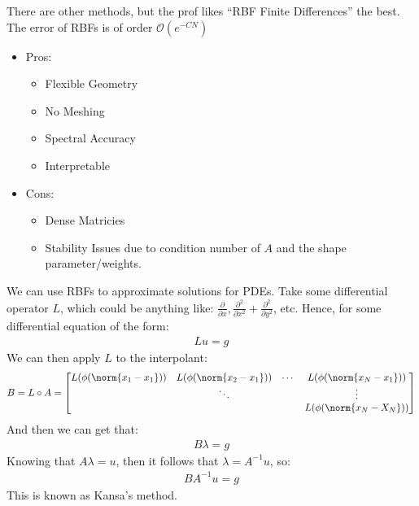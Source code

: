 \documentclass{article}
\begin{document}
There are other methods, but the prof likes ``RBF Finite Differences'' the best.
\gap
{} The error of RBFs is of order $\mathcal{O}(e^{-CN})$
\begin{itemize}
\item Pros:
  \begin{itemize}
  \item Flexible Geometry
  \item No Meshing
  \item Spectral Accuracy
  \item Interpretable
  \end{itemize}
\item Cons:
  \begin{itemize}
  \item Dense Matricies
  \item Stability Issues due to condition number of $A$ and the shape parameter/weights.
  \end{itemize}  
\end{itemize}

 We can use RBFs to approximate
solutions for PDEs. Take some differential operator $L$, which could be anything like: $\frac{\partial}{\partial x}, \frac{\partial^2}{\partial x^2} + \frac{\partial^2}{\partial y^2}$, etc. Hence, for some differential equation of the form:
\begin{align*}
  Lu = g
\end{align*}
We can then apply $L$ to the interpolant:
\begin{align*}
  B = L \circ A = \begin{bmatrix}
    L(\phi(\norm{x_1 - x_1})) & L(\phi(\norm{x_2 - x_1})) & \cdots & L(\phi(\norm{x_N - x_1}))\\
    & \ddots & & \vdots\\
    & & & L(\phi(\norm{x_N - X_N}))
  \end{bmatrix}
\end{align*}
And then we can get that:
\begin{align*}
  B \lambda = g
\end{align*}
Knowing that $A\lambda = u$, then it follows that $\lambda = A^{-1} u$, so:
\begin{align*}
  BA^{-1}u = g
\end{align*}
This is known as Kansa's method.

\clearpage
\end{document}

